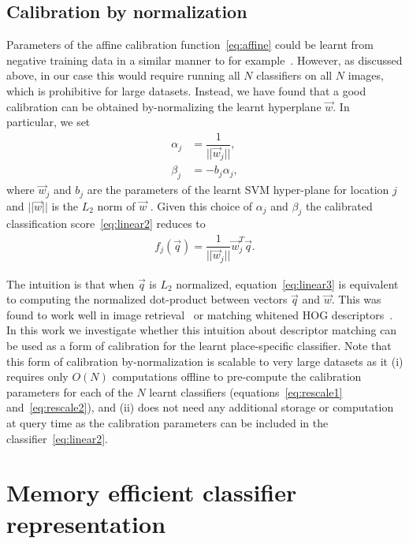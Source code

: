   \subsection{Calibration by normalization}
  Parameters of the affine calibration function~\eqref{eq:affine} could be learnt from negative training data in a similar manner to for example~\cite{Aubry14}. 
  However, as discussed above, in our case this would require running all $N$ classifiers on all $N$ images, which is prohibitive for large datasets.
  Instead, we have found that a good calibration can be obtained by-normalizing the learnt hyperplane $\vec{w}$. In particular, we set 
    \begin{align}
      \label{eq:rescale1}
      \alpha_j &= \dfrac{1}{||\vec{w}_j||},\\ 
      \label{eq:rescale2}
      \beta_j &=  -b_j \alpha_j, 
    \end{align}
  where $\vec{w}_j$ and $b_j$ are the parameters of the learnt SVM hyper-plane for location $j$ and $||\vec{w}||$ is the $L_2$ norm of $\vec{w}$ . Given this choice of $\alpha_j$ and $\beta_j$ the calibrated classification score~\eqref{eq:linear2} reduces to
      \begin{align}
        f_j(\vec{q}) = \dfrac{1}{||\vec{w}_j||}\vec{w}_j^T\vec{q}.
            \label{eq:linear3}
     \end{align}

  The intuition is that when $\vec{q}$ is $L_2$ normalized, equation~\eqref{eq:linear3} is equivalent to computing the normalized dot-product between vectors $\vec{q}$ and $\vec{w}$.       This was found to work well in image retrieval~\cite{Sivic03} or matching whitened HOG descriptors~\cite{Doersch13}.
  In this work we investigate whether this intuition about descriptor matching can be used as a form of calibration for the learnt place-specific classifier.  
  Note  that this form of calibration by-normalization is scalable to very large datasets as it (i) requires only $O(N)$ computations offline to pre-compute the calibration parameters for each of the $N$ learnt classifiers (equations~\eqref{eq:rescale1} and~\eqref{eq:rescale2}), and (ii) does not need any additional storage or computation at query time as the calibration parameters can be included in the classifier~\eqref{eq:linear2}.   


  \section{Memory efficient classifier representation}  
  \label{sec:memory}
  
